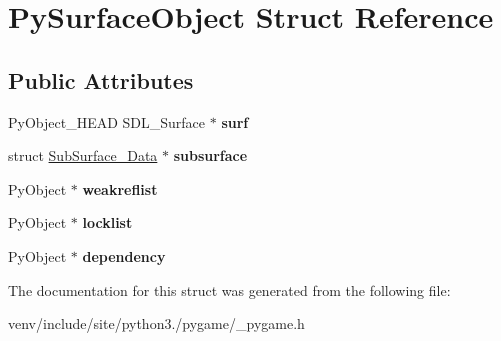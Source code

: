 \hypertarget{struct_py_surface_object}{}\section{Py\+Surface\+Object Struct Reference}
\label{struct_py_surface_object}
\subsection*{Public Attributes}
\begin{DoxyCompactItemize}
\item 
\mbox{\label{struct_py_surface_object_a1efa585af42c7912d1a0d44cda1906e5}} 
Py\+Object\+\_\+\+H\+E\+AD S\+D\+L\+\_\+\+Surface $\ast$ {\bfseries surf}
\item 
\mbox{\label{struct_py_surface_object_adccd6e46a2c9f7deb39d8a22281e25e2}} 
struct \hyperlink{struct_sub_surface___data}{Sub\+Surface\+\_\+\+Data} $\ast$ {\bfseries subsurface}
\item 
\mbox{\label{struct_py_surface_object_af445e5d5c3272427338612a5c98145dd}} 
Py\+Object $\ast$ {\bfseries weakreflist}
\item 
\mbox{\label{struct_py_surface_object_a41924066003e09054c04f9df48c77620}} 
Py\+Object $\ast$ {\bfseries locklist}
\item 
\mbox{\label{struct_py_surface_object_a5334b955fe9ef075347fa64ead71c261}} 
Py\+Object $\ast$ {\bfseries dependency}
\end{DoxyCompactItemize}


The documentation for this struct was generated from the following file\+:\begin{DoxyCompactItemize}
\item 
venv/include/site/python3./pygame/\+\_\+pygame.\+h\end{DoxyCompactItemize}
